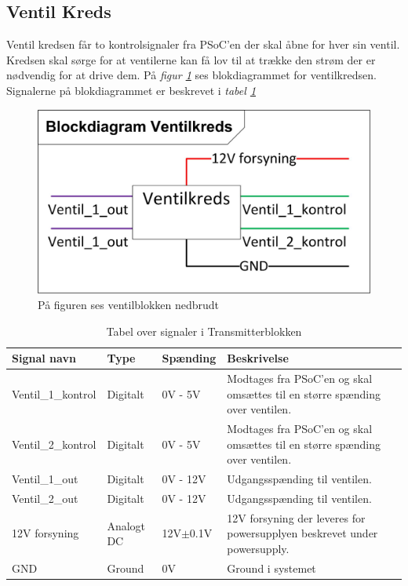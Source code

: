 \subsection{Ventil Kreds}
\label{sec:ventilkreds}
Ventil kredsen får to kontrolsignaler fra PSoC'en der skal åbne for hver sin ventil. Kredsen skal sørge for at ventilerne kan få lov til at trække den strøm der er nødvendig for at drive dem. På \textit{figur \ref{fig:ventilblok}} ses blokdiagrammet for ventilkredsen. Signalerne på blokdiagrammet er beskrevet i \textit{tabel \ref{table:ventrilkreds}}
\begin{figure}[H]
\centering
\includegraphics[scale=1]{billeder/ventilblok}
\caption{På figuren ses ventilblokken nedbrudt}
\label{fig:ventilblok}
\end{figure}
\begin{table}[H]
\begin{tabular}{|p{3cm}|p{3cm}|p{3cm}|p{4.5cm}|} \hline
\cellcolor[gray]{0.85}Signal navn& \cellcolor[gray]{0.85}Type &\cellcolor[gray]{0.85}Spænding&\cellcolor[gray]{0.85}Beskrivelse\\ \hline
Ventil\_1\_kontrol & Digitalt & 0V - 5V & Modtages fra PSoC'en og skal omsættes til en større spænding over ventilen.\\ \hline
Ventil\_2\_kontrol & Digitalt & 0V - 5V & Modtages fra PSoC'en og skal omsættes til en større spænding over ventilen.\\ \hline
Ventil\_1\_out & Digitalt & 0V - 12V & Udgangsspænding til ventilen.\\ \hline
Ventil\_2\_out & Digitalt & 0V - 12V & Udgangsspænding til ventilen.\\ \hline
12V forsyning & Analogt DC & 12V$\pm$0.1V & 12V forsyning der leveres for powersupplyen beskrevet under powersupply.\\ \hline
GND & Ground & 0V & Ground i systemet \\ \hline
\end{tabular}
\caption{Tabel over signaler i Transmitterblokken}
\label{table:ventrilkreds}
\end{table}
\newpage
